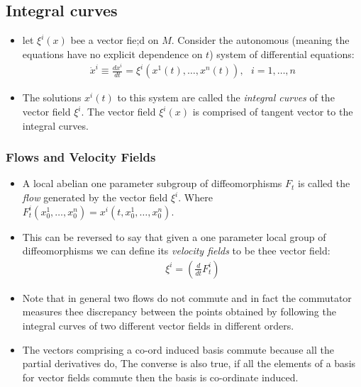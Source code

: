 \documentclass[11pt]{article}
\numberwithin{equation}{section}
\newcommand{\I}[1]{\emph{#1}}
\begin{document}
\subsection{Integral curves} %
\label{sub:integral_curves}
\begin{itemize}
  \item let $\xi^i(x)$ bee a vector fie;d on $M$. Consider the autonomous (meaning the equations have no explicit dependence on $t$) system of differential equations:
  \begin{align*}
  \dot{x}^i \equiv \frac{dx^i}{dt} = \xi^i(x^1(t),\ldots,x^n(t)),~~~i=1,\ldots,n
  \end{align*}
  \item The solutions $x^i(t)$ to this system are called the \I{integral curves} of the vector field $\xi^i$. The vector field $\xi^i(x)$ is comprised of tangent vector to the integral curves.   
\end{itemize}

\subsubsection{Flows and Velocity Fields} %
\label{ssub:flow}
\begin{itemize}
  \item A local abelian one parameter subgroup of diffeomorphisms $F_t$ is called the \I{flow} generated by the vector field $\xi^i$. Where $F^i_t(x^1_0,\ldots,x^n_0) = x^i(t,x^1_0,\ldots,x^n_0)$.

\item This can be reversed to say that given a one parameter local group of diffeomorphisms we can define its \I{velocity fields} to be thee vector field:
\begin{align*}
\xi^i = \left(\frac{d}{dt}F^i_t\right)
\end{align*}
\item Note that in general two flows do not commute and in fact the commutator measures thee discrepancy between the points obtained by following the integral curves of two different vector fields in different orders. 
\item The vectors comprising a co-ord induced basis commute because all the partial derivatives do, The converse is also true, if all the elements of a basis for vector fields commute then the basis is co-ordinate induced.
\end{itemize}
\end{document}
